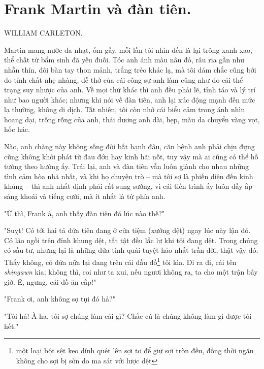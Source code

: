 \section{Frank Martin và đàn tiên.}

\begin{large}
  \begin{center}
    \uppercase{William Carleton.}
  \end{center}
\end{large}

Martin mang nước da nhạt, ốm gầy, mỗi lần tôi nhìn đến là lại trông xanh xao, thể chất từ bẩm sinh đã yếu đuối. Tóc anh ánh màu nâu đỏ, râu ria gần như nhẵn thín, đôi bàn tay thon mảnh, trắng trẻo khác lạ, mà tôi dám chắc cũng bởi do tính chất nhẹ nhàng, dễ thở của cái công sự anh làm cũng như do cái thể trạng suy nhược của anh. Về mọi thứ khác thì anh đều phải lẽ, tỉnh táo và lý trí như bao người khác; nhưng khi nói về đàn tiên, anh lại xúc động mạnh đến mức lạ thường, không di dịch. Tất nhiên, tôi còn nhớ cái biểu cảm trong ánh nhìn hoang dại, trống rỗng của anh, thái dương anh dài, hẹp, màu da chuyển vàng vọt, hốc hác.\par

Nào, anh chàng này không sống đời bất hạnh đâu, căn bệnh anh phải chịu đựng cũng không khởi phát từ đau đớn hay kinh hãi nốt, tuy vậy mà ai cũng có thể hồ tưởng theo hướng ấy. Trái lại, anh và đàn tiên vẫn luôn giành cho nhau những tình cảm hòa nhã nhất, và khi họ chuyện trò – mà tôi sợ là phiến diện đến kinh khủng – thì anh nhất định phải rất sung sướng, vì cái tiến trình ấy luôn đầy ắp sảng khoái và tiếng cười, mà ít nhất là từ phía anh.

"Ừ thì, Frank à, anh thấy đàn tiên đó lúc nào thế?"

"Suỵt! Có tới hai tá đứa tiên đang ở cửa tiệm (xưởng dệt) ngay lúc này lận đó. Có lão ngồi trên đỉnh khung dệt, tất tật đều lắc lư khi tôi đang dệt. Trong chúng có sầu tư, nhưng lại là những đứa tinh quái tuyệt hảo nhất trần đời, thật vậy đó. Thấy không, có đứa nữa lại đang trên cái đầu đồ\footnote{một loại bột sệt keo dính quét lên sợi tơ để giữ sợi tròn đều, đồng thời ngăn không cho sợi bị sờn do ma sát với lược dệt} tôi kìa. Đi ra đi, cái tên \textit{shingawn} kia; không thì, coi như ta xui, nếu ngươi không ra, ta cho một trận bây giờ. Ê, ngưng, cái đồ ăn cắp!"

"Frank ơi, anh không sợ tụi đó hả?"

"Tôi hả! À ha, tôi sợ chúng làm cái gì? Chắc cú là chúng không làm gì được tôi hết."

